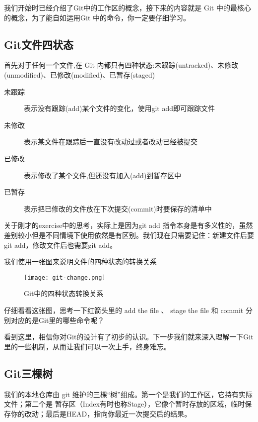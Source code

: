 我们开始时已经介绍了Git中的工作区的概念，接下来的内容就是 Git 中的最核心的概念，为了能自如运用Git 中的命令，你一定要仔细学习。

\subsection{Git文件四状态}
首先对于任何一个文件,在 Git 内都只有四种状态:未跟踪(untracked)、未修改(unmodified)、已修改(modified)、已暂存(staged)
\begin{description}
\item[未跟踪] 表示没有跟踪(add)某个文件的变化，使用git add即可跟踪文件
\item[未修改] 表示某文件在跟踪后一直没有改动过或者改动已经被提交
\item[已修改] 表示修改了某个文件,但还没有加入(add)到暂存区中
\item[已暂存] 表示把已修改的文件放在下次提交(commit)时要保存的清单中
\end{description}

\begin{note}
关于刚才的exercise中的思考，实际上是因为git add 指令本身是有多义性的，虽然差别较小但是不同情境下使用依然是有区别。我们现在只需要记住：新建文件后要git add，修改文件后也需要git add。
\end{note}

我们使用一张图来说明文件的四种状态的转换关系

\begin{figure}[htbp]
	\centering
	\texttt{[image: git-change.png]}
	\caption{Git中的四种状态转换关系}\label{fig:git-change.png}
\end{figure}

\begin{exercise}
仔细看看这张图，思考一下红箭头里的 add the file 、 stage the file 和 commit 分别对应的是Git里的哪些命令呢？
\end{exercise}

看到这里，相信你对Git的设计有了初步的认识。下一步我们就来深入理解一下Git里的一些机制，从而让我们可以一次上手，终身难忘。

\subsection{Git三棵树}\label{Git三棵树}
我们的本地仓库由 git 维护的三棵“树”组成。第一个是我们的工作区，它持有实际文件；第二个是 暂存区（Index有时也称Stage），它像个暂时存放的区域，临时保存你的改动；最后是HEAD，指向你最近一次提交后的结果。

